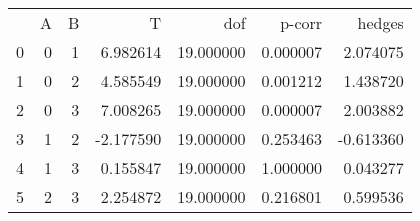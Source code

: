 \begin{tabular}{lrrrrrr}
 & A & B & T & dof & p-corr & hedges \\
0 & 0 & 1 & 6.982614 & 19.000000 & 0.000007 & 2.074075 \\
1 & 0 & 2 & 4.585549 & 19.000000 & 0.001212 & 1.438720 \\
2 & 0 & 3 & 7.008265 & 19.000000 & 0.000007 & 2.003882 \\
3 & 1 & 2 & -2.177590 & 19.000000 & 0.253463 & -0.613360 \\
4 & 1 & 3 & 0.155847 & 19.000000 & 1.000000 & 0.043277 \\
5 & 2 & 3 & 2.254872 & 19.000000 & 0.216801 & 0.599536 \\
\end{tabular}
